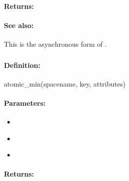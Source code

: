 \paragraph{Returns:}


\paragraph{See also:}  This is the asynchronous form of .

\pagebreak
\subsubsection{}
\label{api:ruby:atomic_min}


\paragraph{Definition:}
\begin{rubycode}
atomic_min(spacename, key, attributes)
\end{rubycode}

\paragraph{Parameters:}
\begin{itemize}[noitemsep]
\item {}\\

\item {}\\

\item {}\\

\end{itemize}

\paragraph{Returns:}


\pagebreak
\subsubsection{}
\label{api:ruby:async_atomic_min}


